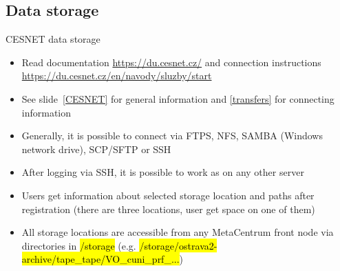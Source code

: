 \documentclass[compress, ucs, xelatex, 11pt, xcolor=svgnames, aspectratio=169,
	hyperref={
		bookmarks=true,
		unicode=true,
		colorlinks=true,
		pdftitle={Linux, command line and MetaCentrum},
		plainpages=false,
		pdfauthor={Vojtech Zeisek},
		pdfsubject={Course about use of Linux command line, writing shell scripts and using MetaCentrum of CESNET},
		pdfcreator={XeLaTeX},
		pdfkeywords={Linux, GNU, BASH, shell, command line, MetaCentrum},
		linkcolor=DarkRed, %
		anchorcolor=DarkBlue, %
		citecolor=Indigo, %
		filecolor=NavyBlue, %
		menucolor=DarkMagenta, %
		urlcolor=DarkBlue, %
		pdftex},
	url={hyphens, lowtilde} %
	]{beamer}
\renewcommand{\texttt}[1]{\hl{\ttfamily #1}}
\begin{document}
\subsection{Data storage}

\begin{frame}{CESNET data storage}
	\begin{itemize}
		\item Read documentation \url{https://du.cesnet.cz/} and connection instructions \url{https://du.cesnet.cz/en/navody/sluzby/start}
		\item See slide~\ref{CESNET} for general information and \ref{transfers} for connecting information
		\item Generally, it is possible to connect via FTPS, NFS, SAMBA (Windows network drive), SCP/SFTP or SSH
		\item After logging via SSH, it is possible to work as on any other server
		\item Users get information about selected storage location and paths after registration (there are three locations, user get space on one of them)
		\item All storage locations are accessible from any MetaCentrum front node via directories in \texttt{/storage} (e.g. \texttt{/storage/ostrava2-archive/tape\_tape/VO\_cuni\_prf\_...})
	\end{itemize}
\end{frame}
\end{document}
